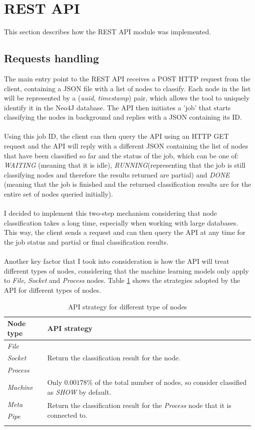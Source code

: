 	\section{REST API} \label{Section: impl/REST}
	This section describes how the REST API module was implemented.
	\subsection{Requests handling} \label{Section: impl/REST/actual}
	The main entry point to the REST API receives a POST HTTP request from the client, containing a JSON file with a list of nodes to classify. Each node in the list will be represented by a (\textit{uuid}, \textit{timestamp}) pair, which allows the tool to uniquely identify it in the Neo4J database. The API then initiates a 'job' that starts classifying the nodes in background and replies with a JSON containing its ID.
	\\ \\
	Using this job ID, the client can then query the API using an HTTP GET request and the API will reply with a different JSON containing the list of nodes that have been classified so far and the status of the job, which can be one of: \textit{WAITING} (meaning that it is idle), \textit{RUNNING}(representing that the job is still classifying nodes and therefore the results returned are partial) and \textit{DONE} (meaning that the job is finished and the returned classification results are for the entire set of nodes queried initially). 
	\\ \\
	I decided to implement this two-step mechanism considering that node classification takes a long time, especially when working with large databases. This way, the client sends a request and can then query the API at any time for the job status and partial or final classification results. 
	\\ \\
	Another key factor that I took into consideration is how the API will treat different types of nodes, considering that the machine learning models only apply to \textit{File}, \textit{Socket} and \textit{Process} nodes. Table \ref{Table: impl/REST/API-strategy} shows the strategies adopted by the API for different types of nodes.
	\begin{longtable}{|p{}|p{}|}
		\textbf{Node type} & \textbf{API strategy} \\
		\hline
		\textit{File} & \multirow{3}{*}{Return the classification result for the node.} \\
		\textit{Socket} & \\
		\textit{Process} & \\
		\hline
		\textit{Machine} & Only $0.00178\%$ of the total number of nodes, so consider classified as \textit{SHOW} by default. \\
		\hline
		\textit{Meta} & \multirow{2}{*}{Return the classification result for the \textit{Process} node that it is connected to.} \\
		\textit{Pipe} & \\
		\hline
		\caption{API strategy for different type of nodes}
		\label{Table: impl/REST/API-strategy}
 	\end{longtable}
